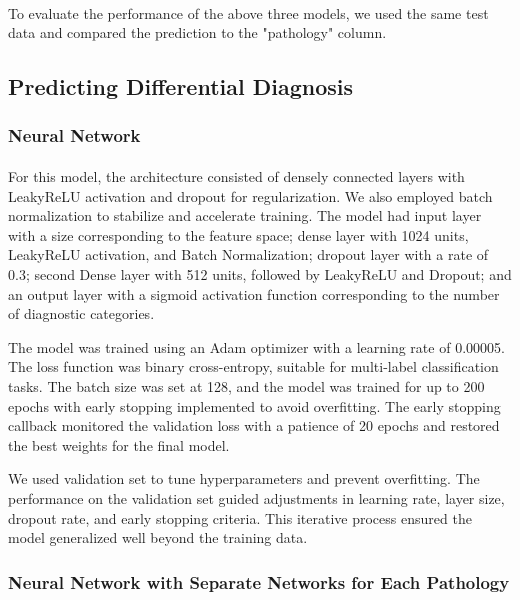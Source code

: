 \documentclass{article}
\begin{document}
\paragraph{ }
To evaluate the performance of the above three models, we used the same test data and compared the prediction to the "pathology" column.

\subsection{Predicting Differential Diagnosis}

\subsubsection{Neural Network}
\paragraph{ }
For this model, the architecture consisted of densely connected layers with LeakyReLU activation and dropout for regularization. We also employed batch normalization to stabilize and accelerate training. The model had input layer with a size corresponding to the feature space; dense layer with 1024 units, LeakyReLU activation, and Batch Normalization;  dropout layer with a rate of 0.3; second Dense layer with 512 units, followed by LeakyReLU and Dropout; and an output layer with a sigmoid activation function corresponding to the number of diagnostic categories.

The model was trained using an Adam optimizer with a learning rate of 0.00005. The loss function was binary cross-entropy, suitable for multi-label classification tasks. The batch size was set at 128, and the model was trained for up to 200 epochs with early stopping implemented to avoid overfitting. The early stopping callback monitored the validation loss with a patience of 20 epochs and restored the best weights for the final model.

We used validation set to tune hyperparameters and prevent overfitting. The performance on the validation set guided adjustments in learning rate, layer size, dropout rate, and early stopping criteria. This iterative process ensured the model generalized well beyond the training data.

\subsubsection{Neural Network with Separate Networks for Each Pathology}
\end{document}
